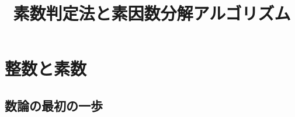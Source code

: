 
\title{素数判定法と素因数分解アルゴリズム}
\author{}
\date{}
\makeindex

\setcounter{notesNum}{1}
\maketitle
\begin{multicols}{2}
\setcounter{tocdepth}{2}
\tableofcontents
\end{multicols}
\newpage

\section{整数と素数}
\subsection{数論の最初の一歩}


\newpage
\printindex



